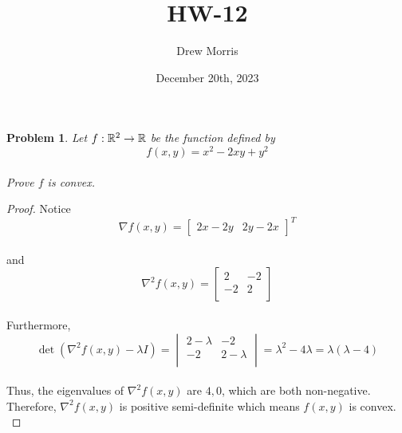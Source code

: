 \documentclass[12pt,oneside]{amsart}
\title{HW-12}
\author{Drew Morris}
\date{December 20th, 2023}
\numberwithin{equation}{section}
\numberwithin{figure}{section}
\theoremstyle{plain}
\newtheorem{prob}{Problem}
\theoremstyle{definition}
\newcommand{\R}{\ensuremath \mathbb{R}}
\begin{document}
\maketitle

\begin{prob}
  Let $f: \R^2 \to \R$ be the function defined by \\
  \[f(x,y) = x^2 - 2xy + y^2\] \\
  Prove $f$ is convex. \\
\end{prob}
\begin{proof}
Notice \\
\[\nabla f(x,y) = \begin{bmatrix}2x-2y & 2y-2x\end{bmatrix}^T\] \\
and \\
\[\nabla^2f(x,y) = \begin{bmatrix} 
  2  & -2 \\
  -2 & 2  \\
\end{bmatrix}\] \\
Furthermore, \\
\[\det(\nabla^2f(x,y) - \lambda I) = \begin{vmatrix}
  2 - \lambda & -2 \\
  -2 & 2 - \lambda \\
\end{vmatrix} = \lambda^2 - 4\lambda = \lambda(\lambda - 4)\] \\
Thus, the eigenvalues of $\nabla^2f(x,y)$ are $4,0$, which are both non-negative. 
Therefore, $\nabla^2f(x,y)$ is positive semi-definite which means $f(x,y)$ is 
convex. \\
\end{proof}
\end{document}
